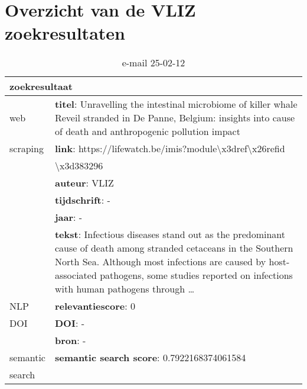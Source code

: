 \section{Overzicht van de VLIZ zoekresultaten}
\begin{table}[h!]
    \caption{e-mail 25-02-12}
    \centering
    \begin{tabularx}{\textwidth}{|p{4cm}|X|} 
        \hline
        \multicolumn{2}{|X|}{\textbf{zoekresultaat}} \\
        \hline
        web &\textbf{titel}: Unravelling the intestinal microbiome of killer whale Reveil stranded in De Panne, Belgium: insights into cause of death and anthropogenic pollution impact\\
        scraping&\textbf{link}: https://lifewatch.be/imis?module\textbackslash x3dref\textbackslash x26refid\\&\textbackslash x3d383296\\
        &\textbf{auteur}: VLIZ\\
        &\textbf{tijdschrift}: -\\
        &\textbf{jaar}: -\\
        &\textbf{tekst}: Infectious diseases stand out as the predominant cause of death among stranded cetaceans in the Southern North Sea. Although most infections are caused by host-associated pathogens, some studies reported on infections with human pathogens through …\\
        \hline
        NLP&\textbf{relevantiescore}: 0\\
        \hline
        DOI&\textbf{DOI}: -\\
        &\textbf{bron}: -\\
        \hline
        semantic&\textbf{semantic search score}: 0.7922168374061584\\
        search&\\
        \hline
    \end{tabularx}
    \label{table:email20250212}
\end{table}
